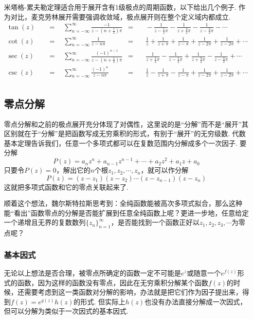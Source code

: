 \documentclass[main.tex]{subfiles}
\begin{document}
米塔格-累夫勒定理适合用于展开含有1级极点的周期函数，以下给出几个例子. 作为对比，麦克劳林展开需要强调收敛域，极点展开则在整个定义域内都成立.
\begin{align*}
    \tan(z) \quad&=\quad \sum_{n=-\infty}^{\infty}\frac{-1}{z-\left(n+\frac{1}{2}\right)\pi} &=&\quad -\frac{1}{z-\frac{1}{2}\pi}-\frac{1}{z+\frac{3}{2}\pi}-\frac{1}{z-\frac{3}{2}\pi}-\cdots & \\
    \cot(z) \quad&=\quad \sum_{n=-\infty}^{\infty}\frac{1}{z-n\pi} &=&\quad \frac{1}{z}+\frac{1}{z+\pi}+\frac{1}{z-\pi}+\frac{1}{z-2\pi}+\frac{1}{z-2\pi}+\cdots & \\
    \sec(z) \quad&=\quad \sum_{n=-\infty}^{\infty}\frac{(-1)^{n-1}}{z-\left(n+\frac{1}{2}\right)\pi} &=&\quad \frac{1}{z+\frac{1}{2}\pi}-\frac{1}{z-\frac{1}{2}\pi}+\frac{1}{z+\frac{3}{2}\pi}-\frac{1}{z-\frac{3}{2}\pi}+\cdots & \\
    \csc(z) \quad&=\quad \sum_{n=-\infty}^{\infty}\frac{(-1)^{n}}{z-n\pi} &=&\quad \frac{1}{z}-\frac{1}{z+\pi}-\frac{1}{z-\pi}+\frac{1}{z-2\pi}+\frac{1}{z-2\pi}+\cdots & \\
\end{align*}

\subsection{零点分解}

零点分解和之前的极点展开充分体现了对偶性，这里说的是“分解”而不是“展开”其区别就在于“分解”是把函数写成无穷乘积的形式，有别于“展开”的无穷级数. 代数基本定理告诉我们，任意一个多项式都可以在复数范围内分解成多个一次因子. 要分解
\[P(z)=a_nz^n+a_{n-1}z^{n-1}+\cdots+a_2z^2+a_1z+a_0\]
只要令\(P(z)=0\)，解出它的\(n\)个根\(z_1,z_2,\cdots,z_n\)，就可以作分解
\[P(z) = (z-z_1)(z-z_2)\cdots(z-z_{n-1})(z-z_n)\]
这就把多项式函数和它的零点关联起来了.

顺着这个想法，魏尔斯特拉斯思考到：全纯函数能被高次多项式拟合，那么这种能“看出”函数零点的分解是否能扩展到任意全纯函数上呢？更进一步地，任意给定一个递增且无界的复数数列\(\{z_n\}_{n=1}^{\infty}\)，是否能找到一个函数正好以\(z_1,z_2,z_3,\cdots\)为零点呢？

\subsubsection{基本因式}

无论以上想法是否合理，被零点所确定的函数一定不可能是\(e^{z}\)或随意一个\(e^{f(z)}\)形式的函数，因为这样的函数没有零点，因此在无穷乘积分解某个函数\(f(z)\)的时候，还需要考虑到这一类函数对分解的影响，办法就是把它们作为因子提出来，得到\(f(z)=e^{g(z)}h(z)\)的形式. 但实际上\(h(z)\)也没有办法直接分解成一次因式，但可以分解为类似于一次因式的基本因式.
\end{document}
